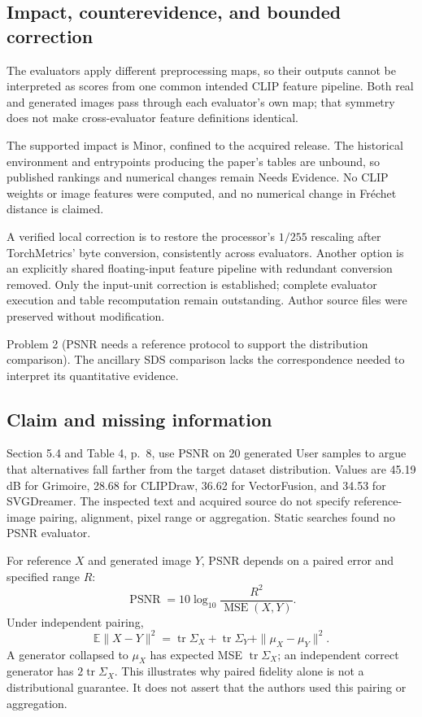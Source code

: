 \documentclass[10pt]{article}
\begin{document}
\subsection*{Impact, counterevidence, and bounded correction}
The evaluators apply different preprocessing maps, so their outputs cannot be interpreted as scores from one common intended CLIP feature pipeline. Both real and generated images pass through each evaluator’s own map; that symmetry does not make cross-evaluator feature definitions identical.\par
The supported impact is Minor, confined to the acquired release. The historical environment and entrypoints producing the paper’s tables are unbound, so published rankings and numerical changes remain Needs Evidence. No CLIP weights or image features were computed, and no numerical change in Fréchet distance is claimed.\par
A verified local correction is to restore the processor’s \(1/255\) rescaling after TorchMetrics’ byte conversion, consistently across evaluators. Another option is an explicitly shared floating-input feature pipeline with redundant conversion removed. Only the input-unit correction is established; complete evaluator execution and table recomputation remain outstanding. Author source files were preserved without modification.\par
Problem 2 (PSNR needs a reference protocol to support the distribution comparison).  The ancillary SDS comparison lacks the correspondence needed to interpret its quantitative evidence.\par
\subsection*{Claim and missing information}
Section 5.4 and Table 4, p. 8, use PSNR on 20 generated User samples to argue that alternatives fall farther from the target dataset distribution. Values are 45.19 dB for Grimoire, 28.68 for CLIPDraw, 36.62 for VectorFusion, and 34.53 for SVGDreamer. The inspected text and acquired source do not specify reference-image pairing, alignment, pixel range or aggregation. Static searches found no PSNR evaluator.\par
For reference \(X\) and generated image \(Y\), PSNR depends on a paired error and specified range \(R\): \[\operatorname{PSNR}=10\log_{10}\frac{R^2}{\operatorname{MSE}(X,Y)}.\] Under independent pairing, \[\mathbb E\|X-Y\|^2
 =\operatorname{tr}\Sigma_X+\operatorname{tr}\Sigma_Y
  +\|\mu_X-\mu_Y\|^2.\] A generator collapsed to \(\mu_X\) has expected MSE \(\operatorname{tr}\Sigma_X\); an independent correct generator has \(2\operatorname{tr}\Sigma_X\). This illustrates why paired fidelity alone is not a distributional guarantee. It does not assert that the authors used this pairing or aggregation.\par
\end{document}
